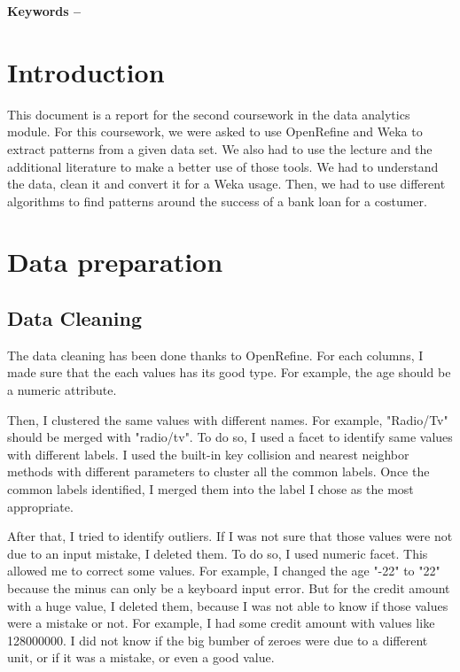 \documentclass[12pt, a4paper]{article}
\title{\mytitle}
\author{\myauthor\hspace{1em}\\\contact\\Edinburgh Napier University\hspace{0.5em}-\hspace{0.5em}\mymodule}
\date{}
\begin{document}
\maketitle

\textbf{Keywords -- }{\mykeywords} 

\section{Introduction}
This document is a report for the second coursework in the data analytics module. For this coursework, we were asked to use OpenRefine and Weka to extract patterns from a given data set. We also had to use the lecture and the additional literature to make a better use of those tools. We had to understand the data, clean it and convert it for a Weka usage. Then, we had to use different algorithms to find patterns around the success of a bank loan for a costumer.

\section{Data preparation}
\subsection{Data Cleaning}
The data cleaning has been done thanks to OpenRefine. For each columns, I made sure that the each values has its good type. For example, the age should be a numeric attribute. 

Then, I clustered the same values with different names. For example, "Radio/Tv" should be merged with "radio/tv". To do so, I used a facet to identify same values with different labels. I used the built-in key collision and nearest neighbor methods with different parameters to cluster all the common labels. Once the common labels identified, I merged them into the label I chose as the most appropriate.

After that, I tried to identify outliers. If I was not sure that those values were not due to an input mistake, I deleted them. To do so, I used numeric facet. This allowed me to correct some values. For example, I changed the age "-22" to "22"  because the minus can only be a keyboard input error. But for the credit amount with a huge value, I deleted them, because I was not able to know if those values were a mistake or not. For example, I had some credit amount with values like 128000000. I did not know if the big bumber of zeroes were due to a different unit, or if it was a mistake, or even a good value.
\end{document}
